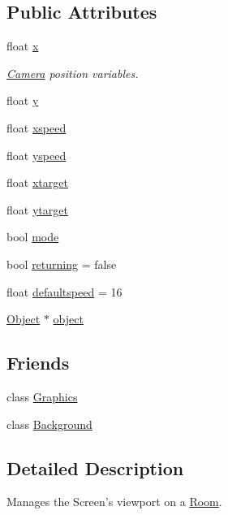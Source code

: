 \subsection*{Public Attributes}
\begin{DoxyCompactItemize}
\item 
float \hyperlink{class_camera_ae270fbd3b09b36f240a2d55b3b5b9cec}{x}
\begin{DoxyCompactList}\small\item\em \hyperlink{class_camera}{Camera} position variables. \end{DoxyCompactList}\item 
float \hyperlink{class_camera_ab0522c72fc25c7fa9ad6d0b91e0a3270}{y}
\item 
float \hyperlink{class_camera_adfb4a7dd79bcb182a6266a0a66a267ac}{xspeed}
\item 
float \hyperlink{class_camera_ad504953b5800588a269fc29ca5521523}{yspeed}
\item 
float \hyperlink{class_camera_a316ec47e1e935729d49821ab4aad930e}{xtarget}
\item 
float \hyperlink{class_camera_a1265c77bac9fc73e043bc359793b2e61}{ytarget}
\item 
bool \hyperlink{class_camera_ac1b290d582f215ce1b0d13aa4dbb5f5a}{mode}
\item 
bool \hyperlink{class_camera_aca4707f8b35c7376b736ff825522eb37}{returning} = false
\item 
float \hyperlink{class_camera_a283eb5bb21146d7b8b12763c731c9b38}{defaultspeed} = 16
\item 
\hyperlink{class_object}{Object} $\ast$ \hyperlink{class_camera_ad836de76be258c26164908b9a5caf770}{object}
\end{DoxyCompactItemize}
\subsection*{Friends}
\begin{DoxyCompactItemize}
\item 
class \hyperlink{class_camera_ae5cfe0c0e0b06d536d5814bd1ff4818f}{Graphics}
\item 
class \hyperlink{class_camera_ad70dac188b152e81b4323bb274bee959}{Background}
\end{DoxyCompactItemize}


\subsection{Detailed Description}
Manages the Screen's viewport on a \hyperlink{class_room}{Room}. 

